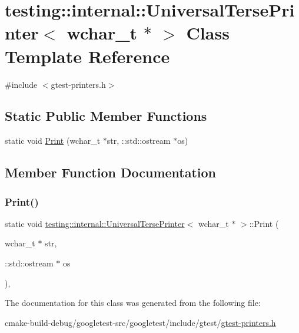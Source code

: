 \hypertarget{classtesting_1_1internal_1_1UniversalTersePrinter_3_01wchar__t_01_5_01_4}{}\section{testing\+::internal\+::Universal\+Terse\+Printer$<$ wchar\+\_\+t $\ast$ $>$ Class Template Reference}
\label{classtesting_1_1internal_1_1UniversalTersePrinter_3_01wchar__t_01_5_01_4}


{\ttfamily \#include $<$gtest-\/printers.\+h$>$}

\subsection*{Static Public Member Functions}
\begin{DoxyCompactItemize}
\item 
static void \mbox{\hyperlink{classtesting_1_1internal_1_1UniversalTersePrinter_3_01wchar__t_01_5_01_4_a9cdf673b44d19e6879253f30f11cd740}{Print}} (wchar\+\_\+t $\ast$str, \+::std\+::ostream $\ast$os)
\end{DoxyCompactItemize}


\subsection{Member Function Documentation}
\mbox{\label{classtesting_1_1internal_1_1UniversalTersePrinter_3_01wchar__t_01_5_01_4_a9cdf673b44d19e6879253f30f11cd740}} 
\subsubsection{\texorpdfstring{Print()}{Print()}}
{\footnotesize\ttfamily static void \mbox{\hyperlink{classtesting_1_1internal_1_1UniversalTersePrinter}{testing\+::internal\+::\+Universal\+Terse\+Printer}}$<$ wchar\+\_\+t $\ast$ $>$\+::Print (\begin{DoxyParamCaption}\item[{wchar\+\_\+t $\ast$}]{str,  }\item[{\+::std\+::ostream $\ast$}]{os }\end{DoxyParamCaption})\hspace{0.3cm}{\ttfamily [inline]}, {\ttfamily [static]}}



The documentation for this class was generated from the following file\+:\begin{DoxyCompactItemize}
\item 
cmake-\/build-\/debug/googletest-\/src/googletest/include/gtest/\mbox{\hyperlink{gtest-printers_8h}{gtest-\/printers.\+h}}\end{DoxyCompactItemize}
